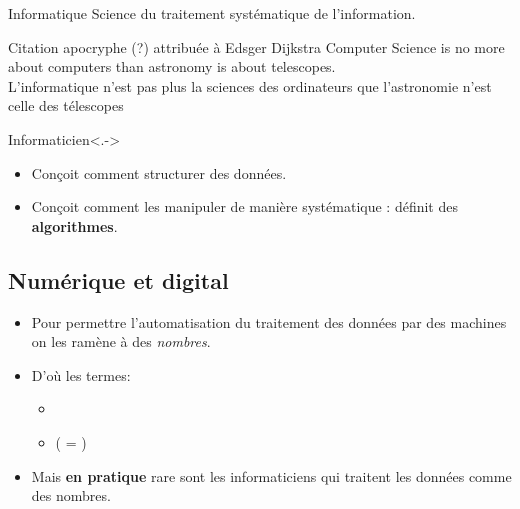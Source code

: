 \begin{slide}

	
	
	\begin{block}{Informatique}
	Science du traitement systématique de l'information.
	\end{block}
	
	
	\begin{exampleblock}{Citation apocryphe (?) attribuée à Edsger Dijkstra}%
	Computer Science is no more about computers than astronomy is about telescopes.\\
	
	L'informatique n'est pas plus la sciences des ordinateurs que l'astronomie n'est celle des télescopes
	\end{exampleblock}
	
\end{slide}

\begin{slide}
	\begin{block}{Informaticien}<.->
		\begin{itemize}
			\item Conçoit comment structurer des données.
			\item Conçoit comment les manipuler de manière systématique : définit des \textbf{algorithmes}.
		\end{itemize}
	\end{block}
\end{slide}
\subsection{Numérique et digital}

\begin{slide}

	\begin{itemize}
		\item Pour permettre l'automatisation du traitement des données par des machines on les ramène à des \emph{nombres}.
		\item D'où les termes:
			\begin{itemize}
				\item {}
				\item {} ( = )
			\end{itemize}
		\item Mais \textbf{en pratique} rare sont les informaticiens qui traitent les données comme des nombres. 
	\end{itemize}
\end{slide}

